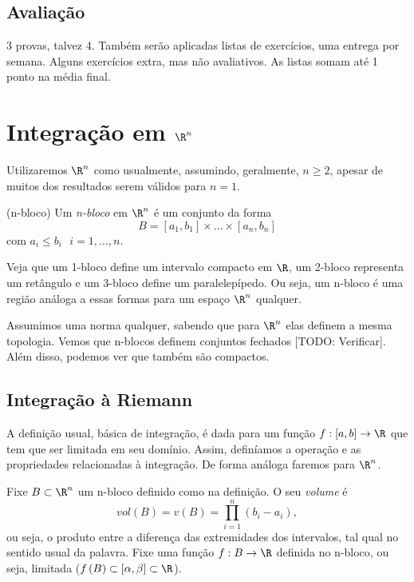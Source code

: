 \subsection*{Avaliação}

3 provas, talvez 4. Também serão aplicadas listas de exercícios, uma entrega por semana. Alguns exercícios extra, mas não avaliativos. As listas somam até 1 ponto na média final.

\section*{Integração em $\R^{n}$}

Utilizaremos $\R^{n}$ como usualmente, assumindo, geralmente, $n\ge 2$, apesar de muitos dos resultados serem válidos para $n=1$.

\begin{definition}
    (n-bloco) Um \emph{n-bloco} em $\R^{n}$ é um conjunto da forma \[
    B = \left[ a_1,b_1 \right] \times \ldots\times \left[ a_n, b_n \right] 
    \] com $a_i\le b_i \text{ } i=1,\ldots,n$.
\end{definition}

Veja que um 1-bloco define um intervalo compacto em $\R$, um 2-bloco representa um retângulo e um 3-bloco define um paralelepípedo. Ou seja, um n-bloco é uma região análoga a essas formas para um espaço $\R^{n}$ qualquer.

Assumimos uma norma qualquer, sabendo que para $\R^{n}$ elas definem a mesma topologia. Vemos que n-blocos definem conjuntos fechados [TODO: Verificar]. Além disso, podemos ver que também são compactos.

\subsection*{Integração à Riemann}

A definição usual, básica de integração, é dada para um função $f:[a,b]\to \R$ que tem que ser limitada em seu domínio. Assim, definíamos a operação e as propriedades relacionadas à integração. De forma análoga faremos para $\R^{n}$.

Fixe $B\subset \R^{n}$ um n-bloco definido como na definição. O seu \emph{volume} é \[
vol\left( B \right) =v\left( B \right) = \prod_{i=1}^{n} \left( b_i - a_i \right)  
,\] ou seja, o produto entre a diferença das extremidades dos intervalos, tal qual no sentido usual da palavra. Fixe uma função $f:B\to \R$ definida no n-bloco, ou seja, limitada ($f\left( B \right) \subset \left[ \alpha, \beta \right] \subset \R$).

